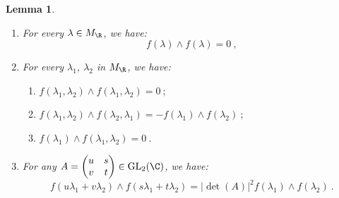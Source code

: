 \documentclass[11pt,letterpaper,english]{amsart}
\numberwithin{equation}{subsection}
\numberwithin{equation}{section}
\theoremstyle{plain}
\newtheorem{lemma}[theorem]{Lemma}
\theoremstyle{remark}
\begin{document}
\begin{lemma}\label{l:algebra-rules}
    \begin{enumerate}
        \item For every $\lambda\in M_\R$, we have: \[f(\lambda)\wedge f(\lambda)=0~,\]  
        \item For every $\lambda_1$, $\lambda_2$ in $M_\R$, we have: 
         \begin{enumerate}
             \item $f(\lambda_1,\lambda_2)\wedge f(\lambda_1,\lambda_2)=0~;$ 
             \item $f(\lambda_1,\lambda_2)\wedge f(\lambda_2,\lambda_1)=-f(\lambda_1)\wedge f(\lambda_2)~;$
             \item  $f(\lambda_1)\wedge f(\lambda_1,\lambda_2)=0~.$

         \end{enumerate}
      \item For any $A=\begin{pmatrix}
          u&s\\v&t
      \end{pmatrix}\in \mathrm{GL}_2(\C)$, we have:
      \[f(u\lambda_1+v\lambda_2)\wedge f(s\lambda_1+t\lambda_2)=|\det(A)|^2f(\lambda_1)\wedge f(\lambda_2)~.\]
    \end{enumerate}
\end{lemma}
\end{document}
